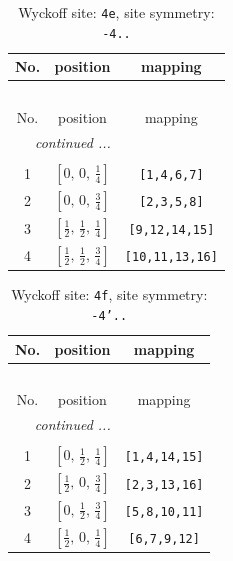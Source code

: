 \documentclass[fleqn,8pt]{jsarticle}
\begin{document}
\renewcommand{\arraystretch}{1.2}
\begin{longtable}{ccc}
\caption{Wyckoff site: {\tt 4e}, site symmetry: {\tt -4..}}
 \\
 \hline \hline
No. & position & mapping \\ \hline \endfirsthead

\multicolumn{2}{l}{\tablename\ \thetable{}} \\
 \hline \hline
No. & position & mapping \\ \hline \endhead

 \hline \hline
\multicolumn{2}{r}{\footnotesize\it continued ...} \\ \endfoot

 \hline \hline
\multicolumn{2}{r}{} \\ \endlastfoot

1 & $\left[ 0,\, 0,\, \frac{1}{4} \right]$ & {\tt [1,4,6,7]} \\ \hline
2 & $\left[ 0,\, 0,\, \frac{3}{4} \right]$ & {\tt [2,3,5,8]} \\ \hline
3 & $\left[ \frac{1}{2},\, \frac{1}{2},\, \frac{1}{4} \right]$ & {\tt [9,12,14,15]} \\ \hline
4 & $\left[ \frac{1}{2},\, \frac{1}{2},\, \frac{3}{4} \right]$ & {\tt [10,11,13,16]} \\
\end{longtable}
\renewcommand{\arraystretch}{1.2}
\begin{longtable}{ccc}
\caption{Wyckoff site: {\tt 4f}, site symmetry: {\tt -4'..}}
 \\
 \hline \hline
No. & position & mapping \\ \hline \endfirsthead

\multicolumn{2}{l}{\tablename\ \thetable{}} \\
 \hline \hline
No. & position & mapping \\ \hline \endhead

 \hline \hline
\multicolumn{2}{r}{\footnotesize\it continued ...} \\ \endfoot

 \hline \hline
\multicolumn{2}{r}{} \\ \endlastfoot

1 & $\left[ 0,\, \frac{1}{2},\, \frac{1}{4} \right]$ & {\tt [1,4,14,15]} \\ \hline
2 & $\left[ \frac{1}{2},\, 0,\, \frac{3}{4} \right]$ & {\tt [2,3,13,16]} \\ \hline
3 & $\left[ 0,\, \frac{1}{2},\, \frac{3}{4} \right]$ & {\tt [5,8,10,11]} \\ \hline
4 & $\left[ \frac{1}{2},\, 0,\, \frac{1}{4} \right]$ & {\tt [6,7,9,12]} \\
\end{longtable}
\end{document}
